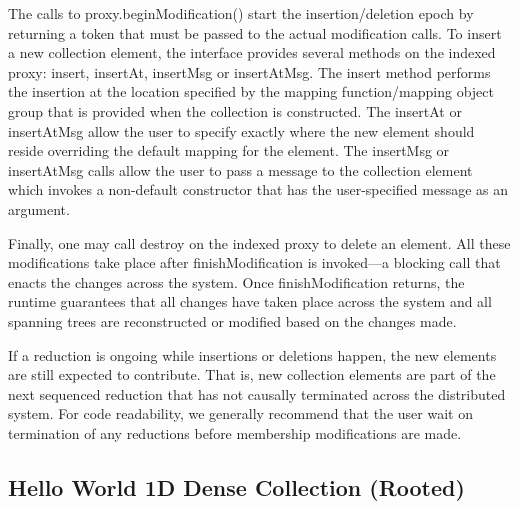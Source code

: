The calls to {\ttfamily proxy.\+begin\+Modification()} start the insertion/deletion epoch by returning a token that must be passed to the actual modification calls. To insert a new collection element, the interface provides several methods on the indexed proxy\+: {\ttfamily insert}, {\ttfamily insert\+At}, {\ttfamily insert\+Msg} or {\ttfamily insert\+At\+Msg}. The {\ttfamily insert} method performs the insertion at the location specified by the mapping function/mapping object group that is provided when the collection is constructed. The {\ttfamily insert\+At} or {\ttfamily insert\+At\+Msg} allow the user to specify exactly where the new element should reside overriding the default mapping for the element. The {\ttfamily insert\+Msg} or {\ttfamily insert\+At\+Msg} calls allow the user to pass a message to the collection element which invokes a non-\/default constructor that has the user-\/specified message as an argument.

Finally, one may call {\ttfamily destroy} on the indexed proxy to delete an element. All these modifications take place after {\ttfamily finish\+Modification} is invoked---a blocking call that enacts the changes across the system. Once {\ttfamily finish\+Modification} returns, the runtime guarantees that all changes have taken place across the system and all spanning trees are reconstructed or modified based on the changes made.

If a reduction is ongoing while insertions or deletions happen, the new elements are still expected to contribute. That is, new collection elements are part of the next sequenced reduction that has not causally terminated across the distributed system. For code readability, we generally recommend that the user wait on termination of any reductions before membership modifications are made.\hypertarget{collection_rooted-hello-world-collection}{}\subsection{Hello World 1\+D Dense Collection (\+Rooted)}\label{collection_rooted-hello-world-collection}

